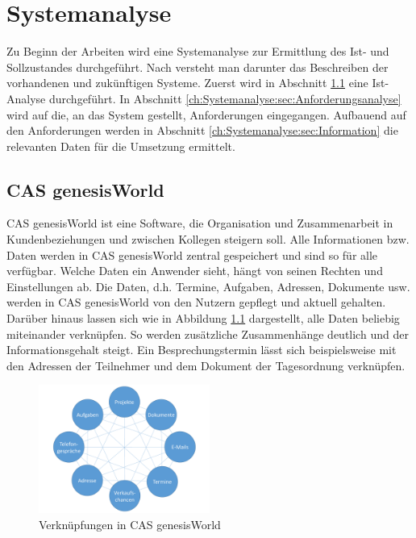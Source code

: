 
\chapter{Systemanalyse}
\label{ch:Systemanalyse}

Zu Beginn der Arbeiten wird eine Systemanalyse zur Ermittlung des Ist- und Sollzustandes durchgeführt. Nach \cite{SWB-380277719} versteht man darunter das Beschreiben der vorhandenen und zukünftigen Systeme. Zuerst wird in Abschnitt \ref{ch:Systemanalyse:sec:genesisWorld} eine Ist-Analyse durchgeführt. In Abschnitt \ref{ch:Systemanalyse:sec:Anforderungsanalyse} wird auf die, an das System gestellt, Anforderungen eingegangen. Aufbauend auf den Anforderungen werden in Abschnitt \ref{ch:Systemanalyse:sec:Information} die relevanten Daten für die Umsetzung ermittelt. 

\section{CAS genesisWorld}
\label{ch:Systemanalyse:sec:genesisWorld}

CAS genesisWorld ist eine Software, die Organisation und Zusammenarbeit in Kundenbeziehungen und zwischen Kollegen steigern soll. Alle Informationen bzw. Daten werden in CAS genesisWorld zentral gespeichert und sind so für alle verfügbar. Welche Daten ein Anwender sieht, hängt von seinen Rechten und Einstellungen ab. Die Daten, d.h. Termine, Aufgaben, Adressen, Dokumente usw. werden in CAS genesisWorld von den Nutzern gepflegt und aktuell gehalten. Darüber hinaus lassen sich wie in Abbildung \ref{picGwCon} dargestellt, alle Daten beliebig miteinander verknüpfen. So werden zusätzliche Zusammenhänge deutlich und der Informationsgehalt steigt. Ein Besprechungstermin lässt sich beispielsweise mit den Adressen der Teilnehmer und dem Dokument der Tagesordnung verknüpfen.

\begin{figure}[H]
	\centering
  \includegraphics[width=0.5\textwidth, width=0.5\textwidth]{pics/CAS_connections.pdf}
	\caption{Verknüpfungen in CAS genesisWorld}
	\label{picGwCon}
\end{figure}

